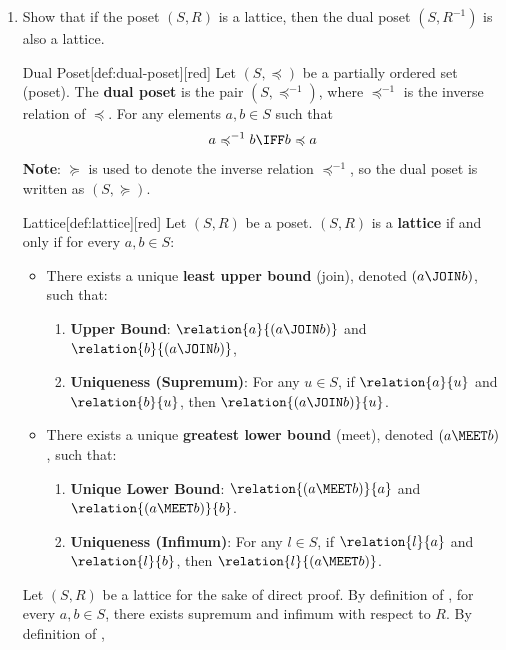 \begin{enumerate}
  \newpage
  \item Show that if the poset $(S, R)$ is a lattice, then the dual poset $\left(S, R^{-1}\right)$ is also a lattice.
  \begin{define}{Dual Poset}[def:dual-poset][red]
    Let $(S, \preccurlyeq)$ be a partially ordered set (poset). 
    The \textbf{dual poset} is the pair $(S, \preccurlyeq^{-1})$, 
    where $\preccurlyeq^{-1}$ is the inverse relation of $\preccurlyeq$. 
    For any elements $a, b \in S$ such that
    \[
      a \preccurlyeq^{-1} b \IFF b \preccurlyeq a
    \]
    \textbf{Note}: $\succcurlyeq$ is used to denote the inverse relation $\preccurlyeq^{-1}$, so the dual poset is written as $(S, \succcurlyeq)$.
  \end{define}
  \begin{define}{Lattice}[def:lattice][red]
    Let $(S, R)$ be a poset. $(S, R)$ is a \textbf{lattice} if and only if for every $a, b \in S$:
    \begin{itemize}
      \item There exists a unique \textbf{least upper bound} (join), denoted $(a \JOIN b)$, such that:
        \begin{enumerate}
          \item \textbf{Upper Bound}: $\relation{a}{(a \JOIN b)}$ and $\relation{b}{(a \JOIN b)}$,
          \item \textbf{Uniqueness (Supremum)}: For any $u \in S$, if $\relation{a}{u}$ and $\relation{b}{u}$, then $\relation{(a \JOIN b)}{u}$.
        \end{enumerate}
      \item There exists a unique \textbf{greatest lower bound} (meet), denoted $(a \MEET b)$, such that:
        \begin{enumerate}
          \item \textbf{Unique Lower Bound}: $\relation{(a \MEET b)}{a}$ and $\relation{(a \MEET b)}{b}$.
          \item \textbf{Uniqueness (Infimum)}: For any $l \in S$, if $\relation{l}{a}$ and $\relation{l}{b}$, then $\relation{l}{(a \MEET b)}$.
        \end{enumerate}
    \end{itemize}
  \end{define}
  \begin{subprove}
    Let $(S, R)$ be a lattice for the sake of direct proof.
    By definition of , for every $a, b \in S$,
    there exists supremum and infimum with respect to $R$.
    By definition of ,

\end{subprove}
\end{enumerate}
